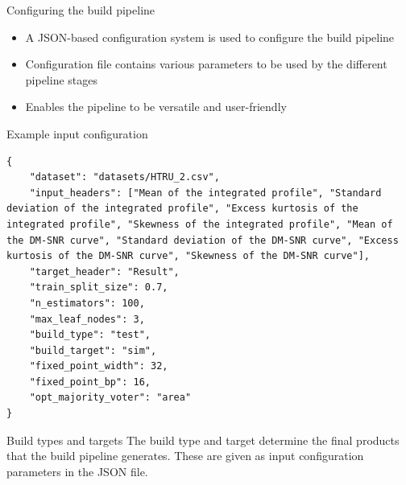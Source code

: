\documentclass[presentation]{beamer}
\begin{document}
\begin{frame}[label={sec:orgf6cccd6}]{Configuring the build pipeline}
\begin{itemize}
\item A \alert{JSON-based configuration system} is used to configure the build pipeline
\item Configuration file contains various parameters to be used by the different pipeline stages
\item Enables the pipeline to be \alert{versatile and user-friendly}
\end{itemize}
\end{frame}

\begin{frame}[label={sec:org8188d05},fragile]{Example input configuration}
 \lstset{language=java,label= ,caption= ,captionpos=b,numbers=none}
\begin{lstlisting}
{
    "dataset": "datasets/HTRU_2.csv",
    "input_headers": ["Mean of the integrated profile", "Standard deviation of the integrated profile", "Excess kurtosis of the integrated profile", "Skewness of the integrated profile", "Mean of the DM-SNR curve", "Standard deviation of the DM-SNR curve", "Excess kurtosis of the DM-SNR curve", "Skewness of the DM-SNR curve"],
    "target_header": "Result",
    "train_split_size": 0.7,
    "n_estimators": 100,
    "max_leaf_nodes": 3,
    "build_type": "test",
    "build_target": "sim",
    "fixed_point_width": 32,
    "fixed_point_bp": 16,
    "opt_majority_voter": "area"
}
\end{lstlisting}
\end{frame}

\begin{frame}[label={sec:orgc49fe33}]{Build types and targets}
The build type and target determine the final products that the build pipeline generates. These are given as input configuration parameters in the JSON file.
\end{frame}
\end{document}
